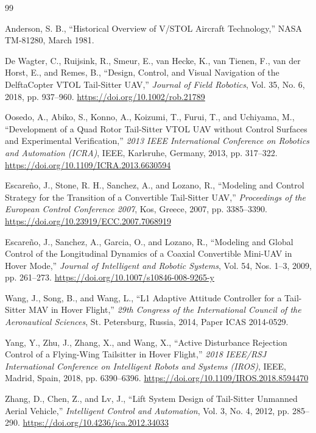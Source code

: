\documentclass[journal]{new-aiaa}
\begin{document}
\begin{thebibliography}{99}

 Anderson, S. B., ``Historical Overview of V/STOL Aircraft Technology,'' NASA TM-81280, March 1981.

 De Wagter, C., Ruijsink, R., Smeur, E., van Hecke, K., van Tienen, F., van der Horst, E., and Remes, B., ``Design, Control, and Visual Navigation of the DelftaCopter VTOL Tail-Sitter UAV,'' \textit{Journal of Field Robotics}, Vol. 35, No. 6, 2018, pp. 937--960. \url{https://doi.org/10.1002/rob.21789}

 Oosedo, A., Abiko, S., Konno, A., Koizumi, T., Furui, T., and Uchiyama, M., ``Development of a Quad Rotor Tail-Sitter VTOL UAV without Control Surfaces and Experimental Verification,'' \textit{2013 IEEE International Conference on Robotics and Automation (ICRA)}, IEEE, Karlsruhe, Germany, 2013, pp. 317--322. \url{https://doi.org/10.1109/ICRA.2013.6630594}

 Escare\~no, J., Stone, R. H., Sanchez, A., and Lozano, R., ``Modeling and Control Strategy for the Transition of a Convertible Tail-Sitter UAV,'' \textit{Proceedings of the European Control Conference 2007}, Kos, Greece, 2007, pp. 3385--3390. \url{https://doi.org/10.23919/ECC.2007.7068919}

 Escare\~no, J., Sanchez, A., Garcia, O., and Lozano, R., ``Modeling and Global Control of the Longitudinal Dynamics of a Coaxial Convertible Mini-UAV in Hover Mode,'' \textit{Journal of Intelligent and Robotic Systems}, Vol. 54, Nos. 1--3, 2009, pp. 261--273. \url{https://doi.org/10.1007/s10846-008-9265-y}

 Wang, J., Song, B., and Wang, L., ``L1 Adaptive Attitude Controller for a Tail-Sitter MAV in Hover Flight,'' \textit{29th Congress of the International Council of the Aeronautical Sciences}, St. Petersburg, Russia, 2014, Paper ICAS 2014-0529.

 Yang, Y., Zhu, J., Zhang, X., and Wang, X., ``Active Disturbance Rejection Control of a Flying-Wing Tailsitter in Hover Flight,'' \textit{2018 IEEE/RSJ International Conference on Intelligent Robots and Systems (IROS)}, IEEE, Madrid, Spain, 2018, pp. 6390--6396. \url{https://doi.org/10.1109/IROS.2018.8594470}

 Zhang, D., Chen, Z., and Lv, J., ``Lift System Design of Tail-Sitter Unmanned Aerial Vehicle,'' \textit{Intelligent Control and Automation}, Vol. 3, No. 4, 2012, pp. 285--290. \url{https://doi.org/10.4236/ica.2012.34033}


\end{thebibliography}
\end{document}
